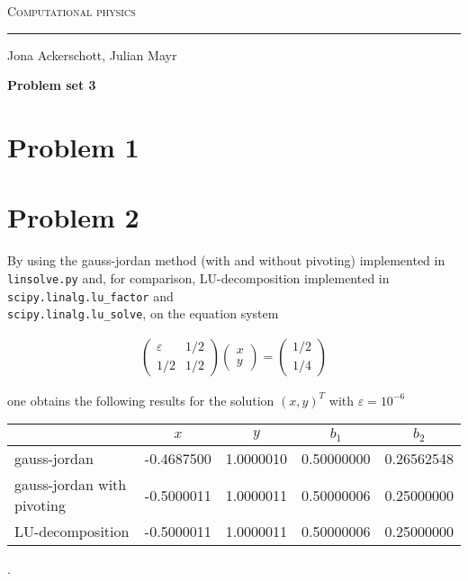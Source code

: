 \documentclass[12pt, a4paper]{article}
\begin{document}
  
  \centerline{\Huge\scshape Computational physics}
  \vspace*{0.5cm}
  \hrule
  \vspace*{0.5cm}
  \centerline{Jona Ackerschott, Julian Mayr}
  \vspace*{1cm}
  \centerline{\Large\bfseries Problem set 3}
  \vspace*{0.5cm}

  \section*{Problem 1}

  \section*{Problem 2}
  By using the gauss-jordan method (with and without pivoting) implemented in {\tt linsolve.py} and, for comparison, LU-decomposition implemented in {\tt scipy.linalg.lu\_factor} and\\ {\tt scipy.linalg.lu\_solve}, on the equation system

  \begin{align}
    \begin{pmatrix} \varepsilon & 1/2 \\ 1/2 & 1/2 \end{pmatrix}
    \begin{pmatrix} x \\ y \end{pmatrix} = 
    \begin{pmatrix} 1/2 \\ 1/4 \end{pmatrix}
    \label{p1_eqsys}
  \end{align}

  \noindent
  one obtains the following results for the solution $(x, y)^T$ with $\varepsilon = 10^{-6}$

  \begin{center}
    \begin{tabular}{l | c | c | c | c}
                                 & $x$        & $y$       & $b_1$       & $b_2$      \\
      \hline
      gauss-jordan               & -0.4687500 & 1.0000010 & 0.50000000  & 0.26562548 \\
      \hline
      gauss-jordan with pivoting & -0.5000011 & 1.0000011 & 0.50000006  & 0.25000000 \\
      \hline
      LU-decomposition           & -0.5000011 & 1.0000011 & 0.50000006  & 0.25000000
    \end{tabular}
  .
  \end{center}
\end{document}

